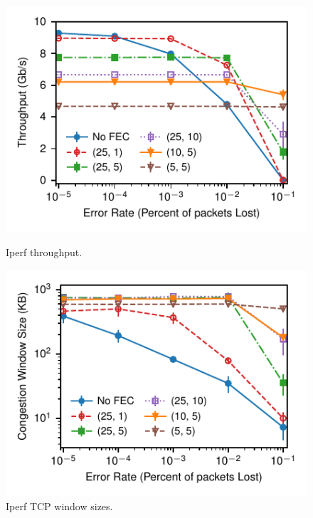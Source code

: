 \begin{figure}[!ht]
\centering
\begin{minipage}[b]{0.31\linewidth}
\includegraphics[width=\linewidth]{figures/lossVsTput.pdf}
\caption{Iperf throughput.}
\label{fig:lossVsTput}
\end{minipage}
\hspace{.05in}
\begin{minipage}[b]{0.31\linewidth}
\includegraphics[width=\textwidth]{figures/lossVsWindow.pdf}
\caption{Iperf TCP window sizes.}
\label{fig:lossVsWindow}
\end{minipage}
\hspace{.05in}
\begin{minipage}[b]{0.31\linewidth}

\end{minipage}
\end{figure}
